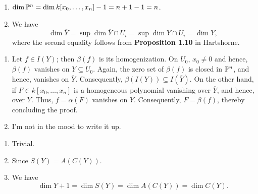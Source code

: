 \begin{exercise}
\begin{enumerate}[label=(\alph*)]
    \item $\dim\mathbb{P}^n = \dim k[x_0,\dots,x_n] - 1 = n + 1 - 1 = n$.
    \item We have 
    \begin{equation*}
        \dim\overline Y = \sup\dim\overline Y\cap U_i = \sup\dim Y\cap U_i = \dim Y,
    \end{equation*}
    where the second equality follows from \textbf{Proposition 1.10} in Hartshorne.
\end{enumerate}
\end{exercise}

\begin{exercise}
\end{exercise}

\begin{exercise}
\begin{enumerate}[label=(\alph*)]
    \item Let $f\in I(Y)$; then $\beta(f)$ is its homogenization. On $U_0$, $x_0\ne 0$ and hence, $\beta(f)$ vanishes on $Y\subseteq U_0$. Again, the zero set of $\beta(f)$ is closed in $\mathbb{P}^n$, and hence, vanishes on $\overline Y$. Consequently, $\beta(I(Y))\subseteq I(\overline Y)$. On the other hand, if $F\in k[x_0,\dots,x_n]$ is a homogeneous polynomial vanishing over $\overline Y$, and hence, over $Y$. Thus, $f = \alpha(F)$ vanishes on $Y$. Consequently, $F = \beta(f)$, thereby concluding the proof.
    \item I'm not in the mood to write it up.
\end{enumerate}
\end{exercise}

\begin{exercise}
\begin{enumerate}[label=(\alph*)]
    \item Trivial.
    \item Since $S(Y) = A(C(Y))$.
    \item We have 
    \begin{equation*}
        \dim Y + 1 = \dim S(Y) = \dim A(C(Y)) = \dim C(Y).
    \end{equation*}
\end{enumerate}
\end{exercise}

\setcounter{exercise}{13}


